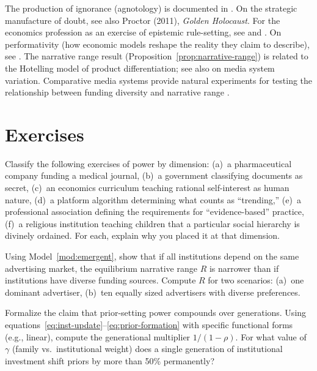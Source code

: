 The production of ignorance (agnotology) is documented in \textcite{oreskes2010}.
On the strategic manufacture of doubt, see also Proctor (2011), \textit{Golden Holocaust}.
For the economics profession as an exercise of epistemic rule-setting, see \textcite{mirowski2009} and \textcite{mudge2018}.
On performativity (how economic models reshape the reality they claim to describe), see \textcite{mackenzie2006}.
The narrative range result (Proposition~\ref{prop:narrative-range}) is related to the Hotelling model of product differentiation; see also \textcite{hallin2004} on media system variation.
Comparative media systems provide natural experiments for testing the relationship between funding diversity and narrative range \autocite{hallin2004}.


\section{Exercises}

\begin{exercise}
Classify the following exercises of power by dimension: (a)~a pharmaceutical company funding a medical journal, (b)~a government classifying documents as secret, (c)~an economics curriculum teaching rational self-interest as human nature, (d)~a platform algorithm determining what counts as ``trending,'' (e)~a professional association defining the requirements for ``evidence-based'' practice, (f)~a religious institution teaching children that a particular social hierarchy is divinely ordained.
For each, explain why you placed it at that dimension.
\end{exercise}

\begin{exercise}
Using Model~\ref{mod:emergent}, show that if all institutions depend on the same advertising market, the equilibrium narrative range $R$ is narrower than if institutions have diverse funding sources.
Compute $R$ for two scenarios: (a)~one dominant advertiser, (b)~ten equally sized advertisers with diverse preferences.
\end{exercise}

\begin{exercise}
Formalize the claim that prior-setting power compounds over generations.
Using equations~\eqref{eq:inst-update}--\eqref{eq:prior-formation} with specific functional forms (e.g., linear), compute the generational multiplier $1/(1-\rho)$.
For what value of $\gamma$ (family vs.\ institutional weight) does a single generation of institutional investment shift priors by more than 50\% permanently?
\end{exercise}

